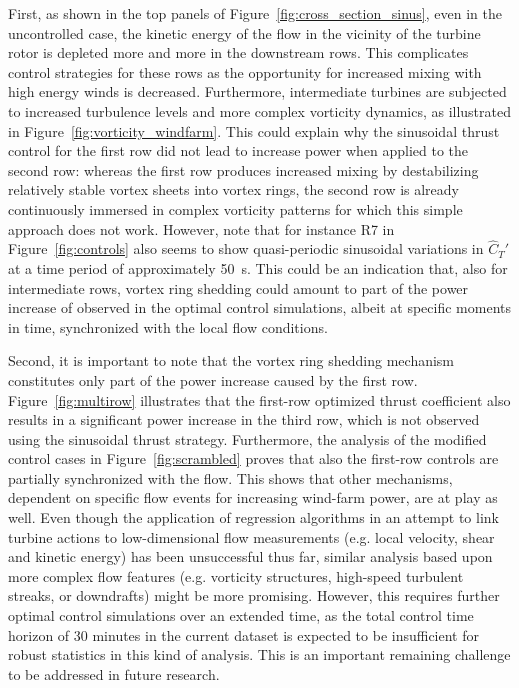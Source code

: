 \documentclass[wes, manuscript]{copernicus}
\newcommand{\cthat}{\widehat{C}_T'}
\begin{document}
First, as shown in the top panels of Figure~\ref{fig:cross_section_sinus}, even in the uncontrolled case, the kinetic energy of the flow in the vicinity of the turbine rotor is depleted more and more in the downstream rows. This complicates control strategies for these rows as the opportunity for increased mixing with high energy winds is decreased. Furthermore, intermediate turbines are subjected to increased turbulence levels and more complex vorticity dynamics, as illustrated in Figure~\ref{fig:vorticity_windfarm}. This could explain why the sinusoidal thrust control for the first row did not lead to increase power when applied to the second row: whereas the first row produces increased mixing by destabilizing relatively stable vortex sheets into vortex rings, the second row is already continuously immersed in complex vorticity patterns for which this simple approach does not work. 
However, note that for instance R7 in Figure~\ref{fig:controls} also seems to show quasi-periodic sinusoidal variations in $\cthat$ at a time period of approximately 50~s. This could be an indication that, also for intermediate rows, vortex ring shedding could amount to part of the power increase of observed in the optimal control simulations, albeit at specific moments in time, synchronized with the local flow conditions.

Second, it is important to note that the vortex ring shedding mechanism constitutes only part of the power increase caused by the first row. Figure~\ref{fig:multirow} illustrates that the first-row optimized thrust coefficient also results in a significant power increase in the third row, which is not observed using the sinusoidal thrust strategy. Furthermore, the analysis of the modified control cases in Figure~\ref{fig:scrambled} proves that also the first-row controls are partially synchronized with the flow. This shows that other mechanisms, dependent on specific flow events for increasing wind-farm power, are at play as well. Even though the application of regression algorithms in an attempt to link turbine actions to low-dimensional flow measurements (e.g. local velocity, shear and kinetic energy) has been unsuccessful thus far, similar analysis based upon more complex flow features (e.g. vorticity structures, high-speed turbulent streaks, or downdrafts) might be more promising. However, this requires further optimal control simulations over an extended time, as the total control time horizon of 30 minutes in the current dataset is expected to be insufficient for robust statistics in this kind of analysis. This is an important remaining challenge to be addressed in future research. 
\end{document}
